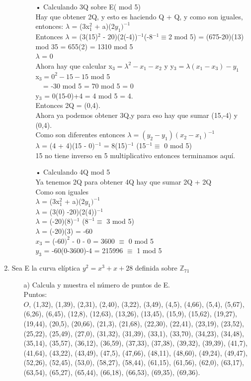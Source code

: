 \documentclass[10pt,a4paper]{article}
\begin{document}
\begin{enumerate}
\begin{itemize}
\begin{itemize}
\item[•] Calculando 3Q sobre E( mod 5)
\\Hay que obtener 2Q, y esto es haciendo Q + Q, y como son iguales, entonces: $\lambda$ = (3x$_{1}^{2}$ + a)(2$y_{1})^{-1}$ 
\\Entonces $\lambda$ = (3(15)$^{2}$ - 20)(2(-4))$^{-1}$(-8$^{-1} \equiv $2 mod 5) = (675-20)(13) mod 35 = 655(2) = 1310 mod 5\\
$\lambda$ = 0 \\
Ahora hay que calcular x$_{3} = \lambda ^{2}- x_{1}- x_{2}$ y y$_{3} = \lambda(x_{1} - x_{3})-y_{1}$
\\x$_{3} = 0^{2}-15-15$ mod 5 
\\$~~~~~$= -30 mod 5 = 70 mod 5 = 0
\\y$_{3}$ = 0(15-0)+4 = 4 mod 5 = 4.
\\Entonces 2Q = (0,4).
\\Ahora ya podemos obtener 3Q,y para eso hay que sumar (15,-4) y (0,4).
\\Como son diferentes entonces $\lambda = (y_{2} - y_{1})(x_{2} - x_{1})^{-1}$
\\$\lambda$ = (4 + 4)(15 - 0)$^{-1}$ = 8(15)$^{-1}$ (15$^{-1} \equiv$ 0 mod 5) 
\\15 no tiene inverso en 5 multiplicativo entonces terminamos aquí.
\item[•] Calculando 4Q mod 5
\\Ya tenemos 2Q para obtener 4Q hay que sumar 2Q + 2Q 
\\Como son iguales 
\\$\lambda$ = (3x$_{1}^{2}$ + a)(2$y_{1})^{-1}$
\\$\lambda$ = (3(0) -20)(2(4))$^{-1}$
\\$\lambda$ = (-20)(8)$^{-1}$ ($8^{-1} \equiv$ 3 mod 5)
\\$\lambda$ = (-20)(3) = -60
\\$x_{3}$ = (-$60)^{2}$ - 0 - 0 = 3600 $\equiv$ 0 mod 5
\\$y_{3}$ = -60(0-3600)-4 = 215996 $\equiv$ 1 mod 5
\\
\end{itemize}
\end{itemize}
\item Sea E la curva elíptica $y^{2} =x^{3}+x+28 $ definida sobre $\mathbb{Z}_{71}$
\begin{itemize}
\item[a)] Calcula y muestra el número de puntos de E.\\
Puntos:\\ $O$, (1,32),
(1,39),
(2,31),
(2,40),
(3,22),
(3,49),
(4,5),
(4,66),
(5,4),
(5,67),
(6,26),
(6,45),
(12,8),
(12,63),
(13,26),
(13,45),
(15,9),
(15,62),
(19,27),
(19,44),
(20,5),
(20,66),
(21,3),
(21,68),
(22,30),
(22,41),
(23,19),
(23,52),
(25,22),
(25,49),
(27,0),
(31,32),
(31,39),
(33,1),
(33,70),
(34,23),
(34,48),
(35,14),
(35,57),
(36,12),
(36,59),
(37,33),
(37,38),
(39,32),
(39,39),
(41,7),
(41,64),
(43,22),
(43,49),
(47,5),
(47,66),
(48,11),
(48,60),
(49,24),
(49,47),
(52,26),
(52,45),
(53,0),
(58,27),
(58,44),
(61,15),
(61,56),
(62,0),
(63,17),
(63,54),
(65,27),
(65,44),
(66,18),
(66,53),
(69,35),
(69,36).



\end{itemize}
\end{enumerate}
\end{document}
